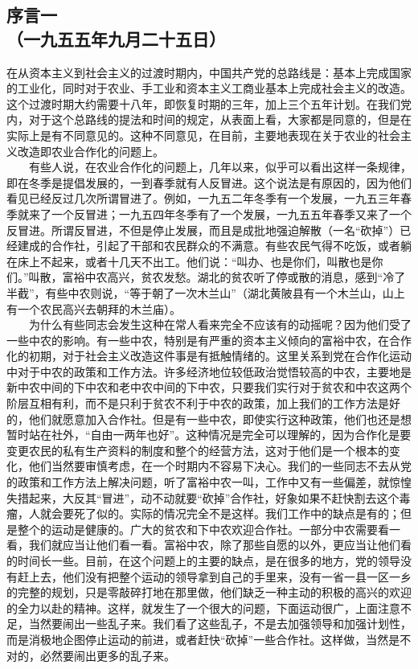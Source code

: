 \documentclass[cn,11pt,chinese]{elegantbook}
\def\myformat#1{\hfil\hfil #1}
\begin{document}
\subsection*{\myformat{序言一}\\\myformat{（一九五五年九月二十五日）}}

在从资本主义到社会主义的过渡时期内，中国共产党的总路线是：基本上完成国家的工业化，同时对于农业、手工业和资本主义工商业基本上完成社会主义的改造。这个过渡时期大约需要十八年，即恢复时期的三年，加上三个五年计划。在我们党内，对于这个总路线的提法和时间的规定，从表面上看，大家都是同意的，但是在实际上是有不同意见的。这种不同意见，在目前，主要地表现在关于农业的社会主义改造即农业合作化的问题上。\\
　　有些人说，在农业合作化的问题上，几年以来，似乎可以看出这样一条规律，即在冬季是提倡发展的，一到春季就有人反冒进。这个说法是有原因的，因为他们看见已经反过几次所谓冒进了。例如，一九五二年冬季有一个发展，一九五三年春季就来了一个反冒进；一九五四年冬季有了一个发展，一九五五年春季又来了一个反冒进。所谓反冒进，不但是停止发展，而且是成批地强迫解散（一名“砍掉”）已经建成的合作社，引起了干部和农民群众的不满意。有些农民气得不吃饭，或者躺在床上不起来，或者十几天不出工。他们说：“叫办、也是你们，叫散也是你们。”叫散，富裕中农高兴，贫农发愁。湖北的贫农听了停或散的消息，感到“冷了半截”，有些中农则说，“等于朝了一次木兰山”（湖北黄陂县有一个木兰山，山上有一个农民高兴去朝拜的木兰庙）。\\
　　为什么有些同志会发生这种在常人看来完全不应该有的动摇呢？因为他们受了一些中农的影响。有一些中农，特别是有严重的资本主义倾向的富裕中农，在合作化的初期，对于社会主义改造这件事是有抵触情绪的。这里关系到党在合作化运动中对于中农的政策和工作方法。许多经济地位较低政治觉悟较高的中农，主要地是新中农中间的下中农和老中农中间的下中农，只要我们实行对于贫农和中农这两个阶层互相有利，而不是只利于贫农不利于中农的政策，加上我们的工作方法是好的，他们就愿意加入合作社。但是有一些中农，即使实行这种政策，他们也还是想暂时站在社外，“自由一两年也好”。这种情况是完全可以理解的，因为合作化是要变更农民的私有生产资料的制度和整个的经营方法，这对于他们是一个根本的变化，他们当然要审慎考虑，在一个时期内不容易下决心。我们的一些同志不去从党的政策和工作方法上解决问题，听了富裕中农一叫，工作中又有一些偏差，就惊惶失措起来，大反其“冒进”，动不动就要“砍掉”合作社，好象如果不赶快割去这个毒瘤，人就会要死了似的。实际的情况完全不是这样。我们工作中的缺点是有的；但是整个的运动是健康的。广大的贫农和下中农欢迎合作社。一部分中农需要看一看，我们就应当让他们看一看。富裕中农，除了那些自愿的以外，更应当让他们看的时间长一些。目前，在这个问题上的主要的缺点，是在很多的地方，党的领导没有赶上去，他们没有把整个运动的领导拿到自己的手里来，没有一省一县一区一乡的完整的规划，只是零敲碎打地在那里做，他们缺乏一种主动的积极的高兴的欢迎的全力以赴的精神。这样，就发生了一个很大的问题，下面运动很广，上面注意不足，当然要闹出一些乱子来。我们看了这些乱子，不是去加强领导和加强计划性，而是消极地企图停止运动的前进，或者赶快“砍掉”一些合作社。这样做，当然是不对的，必然要闹出更多的乱子来。\\
\end{document}
